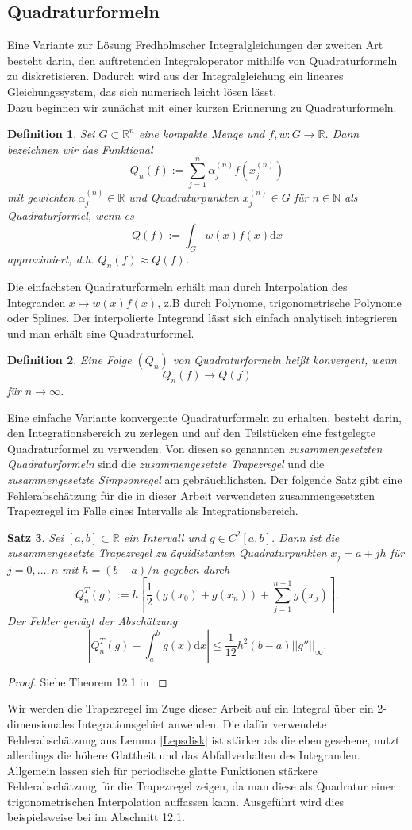 \documentclass[12pt,a4paper]{scrartcl}
\newtheorem{Satz}{Satz}[section]
\newtheorem{Def}[Satz]{Definition}
\newcommand{\dd}{\mathrm{d}}
\numberwithin{equation}{section}
\newcommand{\R}{\mathbb{R}} %
\newcommand{\N}{\mathbb{N}} %
\begin{document}
\subsection{Quadraturformeln}
Eine Variante zur Lösung Fredholmscher Integralgleichungen der zweiten Art besteht darin, den auftretenden Integraloperator mithilfe von Quadraturformeln zu diskretisieren. Dadurch wird aus der Integralgleichung ein lineares Gleichungssystem, das sich numerisch leicht lösen lässt. \\
Dazu beginnen wir zunächst mit einer kurzen Erinnerung zu Quadraturformeln.
\begin{Def}
Sei $G\subset \R^n$ eine kompakte Menge und $f,w: G \to \R$. Dann bezeichnen wir das Funktional
\[
  Q_n(f):= \sum_{j=1}^n \alpha_j^{(n)}f(x_j^{(n)})
\]
mit gewichten $\alpha_j^{(n)}\in \R$ und Quadraturpunkten $x_j^{(n)} \in G$ für $n\in \N$ als \emph{Quadraturformel}, wenn es 
\[
 Q(f) := \int_G w(x)f(x) \dd x
\]
approximiert, d.h. $Q_n(f) \approx Q(f)$.
\end{Def}
Die einfachsten Quadraturformeln erhält man durch Interpolation des Integranden $x \mapsto w(x)f(x)$, z.B durch Polynome, trigonometrische Polynome oder Splines. Der interpolierte Integrand lässt sich einfach analytisch integrieren und man erhält eine Quadraturformel.    
\begin{Def}
  Eine Folge $(Q_n)$ von Quadraturformeln heißt \emph{konvergent}, wenn \[Q_n(f) \to Q(f)\] für $n \to \infty$. 
\end{Def}
Eine einfache Variante konvergente Quadraturformeln zu erhalten, besteht darin, den Integrationsbereich zu zerlegen und auf den Teilstücken eine festgelegte Quadraturformel zu verwenden. Von diesen so genannten \emph{zusammengesetzten Quadraturformeln} sind die \emph{zusammengesetzte Trapezregel} und die \emph{zusammengesetzte Simpsonregel} am gebräuchlichsten. Der folgende Satz gibt eine Fehlerabschätzung für die in dieser Arbeit verwendeten zusammengesetzten Trapezregel im Falle eines Intervalls als Integrationsbereich.
\begin{Satz} \label{Trapez}
  Sei $[a,b]\subset \R$ ein Intervall und $g\in C^2[a,b]$. Dann ist die zusammengesetzte Trapezregel zu äquidistanten Quadraturpunkten $x_j=a+j h$ für $j=0,\dots,n$ mit $h=(b-a)/n$ gegeben durch
\[
  Q^T_n(g) := h \left[ \frac{1}{2}(g(x_0)+g(x_n))+\sum_{j=1}^{n-1} g(x_j) \right].
\] 
Der Fehler genügt der Abschätzung
\[
  \left|Q^T_n(g)-\int_a^b g(x) \dd x \right| \leq \frac{1}{12} h^2(b-a)||g''||_\infty .
\]
\end{Satz}  
\begin{proof}
  Siehe Theorem 12.1 in \cite{kress}
\end{proof}
Wir werden die Trapezregel im Zuge dieser Arbeit auf ein Integral über ein 2-dimensionales Integrationsgebiet anwenden. Die dafür verwendete Fehlerabschätzung aus Lemma \ref{Lepsdisk} ist stärker als die eben gesehene, nutzt allerdings die höhere Glattheit und das Abfallverhalten des Integranden. Allgemein lassen sich für periodische glatte Funktionen stärkere Fehlerabschätzung für die Trapezregel zeigen, da man diese als Quadratur einer trigonometrischen Interpolation auffassen kann.
Ausgeführt wird dies beispielsweise bei \cite{kress} im Abschnitt 12.1.
\end{document}
